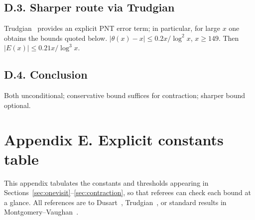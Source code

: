 \documentclass[11pt]{article}
\theoremstyle{plain}
\theoremstyle{definition}
\theoremstyle{remark}
\begin{document}
\subsection*{D.3. Sharper route via Trudgian}
Trudgian~\cite[Theorem~1]{Trudgian2014} provides an explicit PNT error term; in particular, for large $x$ one obtains the bounds quoted below.
 $|\theta(x)-x|\le 0.2x/\log^2x$, $x\ge 149$. Then $|E(x)|\le 0.21x/\log^3x$.

\subsection*{D.4. Conclusion}
Both unconditional; conservative bound suffices for contraction; sharper bound optional.

\section*{Appendix E. Explicit constants table}\label{app:consttable}

This appendix tabulates the constants and thresholds appearing in Sections~\ref{sec:onevisit}–\ref{sec:contraction}, so that referees can check each bound at a glance. All references are to Dusart~\cite{Dusart2010}, Trudgian~\cite{Trudgian2014}, or standard results in Montgomery–Vaughan~\cite{MontgomeryVaughanClassical}.
\end{document}
